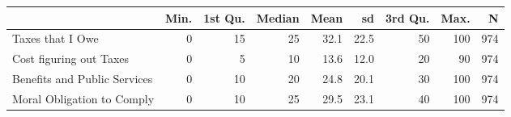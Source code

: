 \begin{table}[ht]
\centering
\begin{tabular}{lrrrrrrrr}
  \hline
 & Min. & 1st Qu. & Median & Mean & sd & 3rd Qu. & Max. & N \\ 
  \hline
Taxes that I Owe &  0 & 15 & 25 & 32.1 & 22.5 & 50 & 100 & 974 \\ 
  Cost figuring out Taxes &  0 &  5 & 10 & 13.6 & 12.0 & 20 & 90 & 974 \\ 
  Benefits and Public Services &  0 & 10 & 20 & 24.8 & 20.1 & 30 & 100 & 974 \\ 
  Moral Obligation to Comply &  0 & 10 & 25 & 29.5 & 23.1 & 40 & 100 & 974 \\ 
   \hline
\end{tabular}
\end{table}
